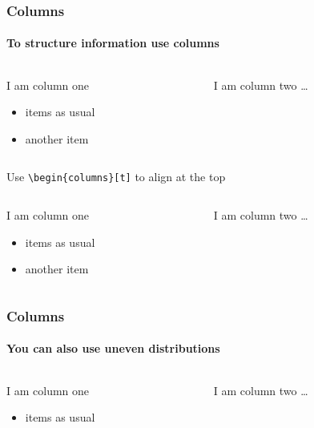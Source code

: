\begin{frame}[fragile]
\frametitle{Columns}
\framesubtitle{To structure information use columns}
\begin{columns}[onlytextwidth]%
  \begin{column}{.485\textwidth}
    \begin{block}{I am column one}
      \begin{itemize}
        \item items as usual
        \item another item
      \end{itemize}
    \end{block}
  \end{column}
  \begin{column}{.485\textwidth}
    \begin{block}{I am column two}
      \dots
    \end{block}
  \end{column}
\end{columns}
\vspace{1ex}

Use \verb!\begin{columns}[t]! to align at the top

\begin{columns}[t,onlytextwidth]
  \begin{column}{.485\textwidth}
    \begin{block}{I am column one}
      \begin{itemize}
        \item items as usual
        \item another item
      \end{itemize}
    \end{block}
  \end{column}
  \begin{column}{.485\textwidth}
    \begin{block}{I am column two}
      \dots
    \end{block}
  \end{column}
\end{columns}
\end{frame}

\begin{frame}
\frametitle{Columns}
\framesubtitle{You can also use uneven distributions}
\begin{columns}[t, onlytextwidth]
  \begin{column}{.285\textwidth}
    \begin{block}{I am column one}
      \begin{itemize}
        \item items as usual
      \end{itemize}
    \end{block}
  \end{column}
  \begin{column}{.685\textwidth}
    \begin{block}{I am column two}
      \dots
    \end{block}
  \end{column}
\end{columns}
\end{frame}

